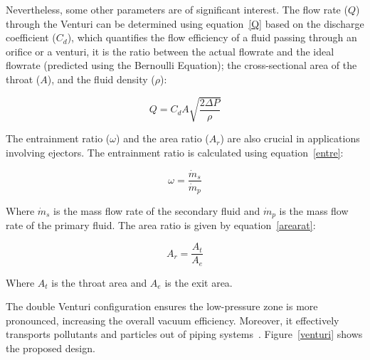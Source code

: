 Nevertheless, some other parameters are of significant interest. The flow rate ($Q$) through the Venturi can be determined using equation~\ref{Q} based on the discharge coefficient ($C_d$), which quantifies the flow efficiency of a fluid passing through an orifice or a venturi, it is the ratio between the actual flowrate and the ideal flowrate (predicted using the Bernoulli Equation);  the cross-sectional area of the throat ($A$), and the fluid density ($\rho$):

\begin{equation}
Q = C_d A \sqrt{\frac{2 \Delta P}{\rho}}
\label{Q}
\end{equation}

The entrainment ratio ($\omega$) and the area ratio ($A_r$) are also crucial in applications involving ejectors. The entrainment ratio is calculated using equation~\ref{entre}:

\begin{equation}
\omega = \frac{\dot{m}_s}{\dot{m}_p}
\label{entre}
\end{equation}

Where $\dot{m}_s$ is the mass flow rate of the secondary fluid and $\dot{m}_p$ is the mass flow rate of the primary fluid. The area ratio is given by equation~\ref{arearat}:

\begin{equation}
A_r = \frac{A_t}{A_e}
\label{arearat}
\end{equation}

Where $A_t$ is the throat area and $A_e$ is the exit area. 

The double Venturi configuration ensures the low-pressure zone is more pronounced, increasing the overall vacuum efficiency. Moreover, it effectively transports pollutants and particles out of piping systems~\cite{Xu2016, xiong2005three}. Figure~\ref{venturi} shows the proposed design.

